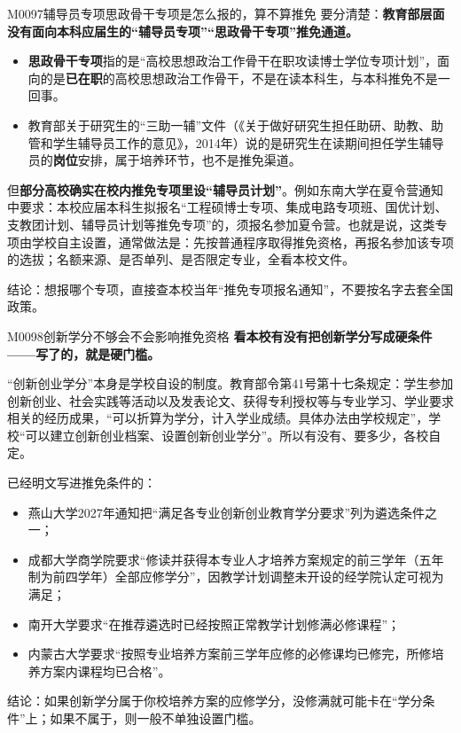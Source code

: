 \begin{qa}{M0097}{辅导员专项思政骨干专项是怎么报的，算不算推免}
要分清楚：\textbf{教育部层面没有面向本科应届生的“辅导员专项”“思政骨干专项”推免通道。}

\begin{itemize}
  \item \textbf{思政骨干专项}指的是“高校思想政治工作骨干在职攻读博士学位专项计划”，面向的是\textbf{已在职}的高校思想政治工作骨干，不是在读本科生，与本科推免不是一回事。
  \item 教育部关于研究生的“三助一辅”文件（《关于做好研究生担任助研、助教、助管和学生辅导员工作的意见》，2014年）说的是研究生在读期间担任学生辅导员的\textbf{岗位}安排，属于培养环节，也不是推免渠道。
\end{itemize}

但\textbf{部分高校确实在校内推免专项里设“辅导员计划”}。例如东南大学在夏令营通知中要求：本校应届本科生拟报名“工程硕博士专项、集成电路专项班、国优计划、支教团计划、辅导员计划等推免专项”的，须报名参加夏令营。也就是说，这类专项由学校自主设置，通常做法是：先按普通程序取得推免资格，再报名参加该专项的选拔；名额来源、是否单列、是否限定专业，全看本校文件。

结论：想报哪个专项，直接查本校当年“推免专项报名通知”，不要按名字去套全国政策。
\end{qa}

\begin{qa}{M0098}{创新学分不够会不会影响推免资格}
\textbf{看本校有没有把创新学分写成硬条件——写了的，就是硬门槛。}

“创新创业学分”本身是学校自设的制度。教育部令第41号第十七条规定：学生参加创新创业、社会实践等活动以及发表论文、获得专利授权等与专业学习、学业要求相关的经历成果，“可以折算为学分，计入学业成绩。具体办法由学校规定”，学校“可以建立创新创业档案、设置创新创业学分”。所以有没有、要多少，各校自定。

已经明文写进推免条件的：
\begin{itemize}
  \item 燕山大学2027年通知把“满足各专业创新创业教育学分要求”列为遴选条件之一；
  \item 成都大学商学院要求“修读并获得本专业人才培养方案规定的前三学年（五年制为前四学年）全部应修学分”，因教学计划调整未开设的经学院认定可视为满足；
  \item 南开大学要求“在推荐遴选时已经按照正常教学计划修满必修课程”；
  \item 内蒙古大学要求“按照专业培养方案前三学年应修的必修课均已修完，所修培养方案内课程均已合格”。
\end{itemize}

结论：如果创新学分属于你校培养方案的应修学分，没修满就可能卡在“学分条件”上；如果不属于，则一般不单独设置门槛。
\end{qa}

